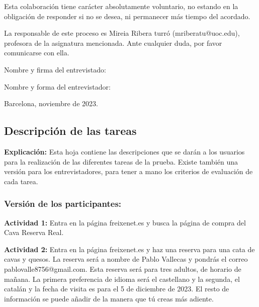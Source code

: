 \documentclass[spanish]{article}
\begin{document}
Esta colaboración tiene carácter absolutamente voluntario,
no estando en la obligación de responder si no se desea, ni
permanecer más tiempo del acordado.\newline

La responsable de este proceso es Mireia Ribera turró
(mriberatu@uoc.edu), profesora de la asignatura mencionada.
Ante cualquier duda, por favor comunicarse con ella.\newline

\hspace{2cm}

Nombre y firma del entrevistado:\newline

\hspace{2cm}

Nombre y forma del entrevistador:\newline

\hspace{2cm}

Barcelona, noviembre de 2023.

\newpage

\subsection{Descripción de las tareas}

\textbf{Explicación:} Esta hoja contiene las descripciones que se
darán a los usuarios para la realización de las diferentes
tareas de la prueba. Existe también una versión para los
entrevistadores, para tener a mano los criterios de
evaluación de cada tarea.

\subsubsection{Versión de los participantes:}

\textbf{Actividad 1:} Entra en la página freixenet.es y busca la
página de compra del Cava Reserva Real.\newline

\textbf{Actividad 2:} Entra en la página freixenet.es
y haz una reserva para una cata de cavas y quesos. La
reserva será a nombre de Pablo Vallecas y pondrás el correo
pablovalle8756@gmail.com. Esta reserva será para tres
adultos, de horario de mañana. La primera preferencia de
idioma será el castellano y la segunda, el catalán y la
fecha de visita es para el 5 de diciembre de 2023. El resto
de información se puede añadir de la manera que tú creas más
adiente.\newline
\end{document}
